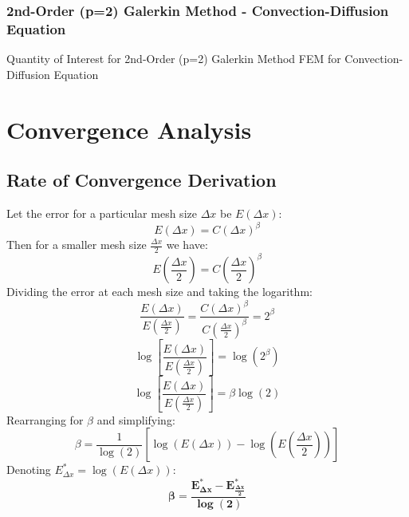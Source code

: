 \documentclass[10pt]{article}		%
\numberwithin{equation}{section}
\begin{document}
\newpage

\subsubsection{2nd-Order (p=2) Galerkin Method - Convection-Diffusion Equation}

\begin{table}[H]
	\caption{Quantity of Interest for  2nd-Order (p=2) Galerkin Method FEM for Convection-Diffusion Equation}	
\end{table}

\newpage

\section{Convergence Analysis}

\subsection{Rate of Convergence Derivation}

Let the error for a particular mesh size $\Delta x$ be $E\left(\Delta x\right)$:
\begin{equation}
E\left(\Delta x\right) = C\left(\Delta x\right)^\beta
\end{equation}
Then for a smaller mesh size $\frac{\Delta x}{2}$ we have:
\begin{equation}
E\left(\frac{\Delta x}{2}\right) = C\left(\frac{\Delta x}{2}\right)^\beta
\end{equation}
Dividing the error at each mesh size and taking the logarithm:
\begin{equation}
\frac{E\left(\Delta x\right)}{E\left(\frac{\Delta x}{2}\right)} = \frac{C\left(\Delta x\right)^\beta}{C\left(\frac{\Delta x}{2}\right)^\beta} = 2^\beta
\end{equation}
\begin{equation}
\log\left[\frac{E\left(\Delta x\right)}{E\left(\frac{\Delta x}{2}\right)}\right] = \log(2^\beta)
\end{equation}
\begin{equation}
\log\left[\frac{E\left(\Delta x\right)}{E\left(\frac{\Delta x}{2}\right)}\right] = \beta \log(2)
\end{equation}
Rearranging for $\beta$ and simplifying:
\begin{equation}
\beta = \frac{1}{\log(2)} \left[\log\left(E\left(\Delta x\right)\right) - \log\left(E\left(\frac{\Delta x}{2}\right)\right)\right] 
\end{equation}
Denoting $E^*_{\Delta x} = \log\left(E\left(\Delta x\right)\right)$:
\begin{equation}
\mathbf{\beta = \frac{E^*_{\Delta x} - E^*_{\frac{\Delta x}{2}}}{\log (2)}}
\end{equation}
\end{document}
